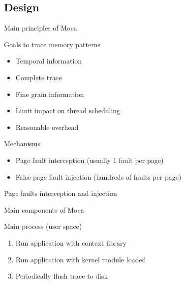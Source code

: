 \documentclass[xcolor={usenames,dvipsnames},hyperref={pdfusetitle}]{beamer}
\begin{document}
\subsection{Design}

\begin{frame}{Main principles of Moca}
    \begin{block}{Goals to trace memory patterns}
        \begin{itemize}
            \item Temporal information
            \item Complete trace
            \item Fine grain information
            \item Limit impact on thread scheduling
            \item Reasonable overhead
        \end{itemize}
    \end{block}
    \pause
    \begin{exampleblock}{Mechanisms}
        \begin{itemize}
            \item Page fault interception (usually 1 fault per page)
            \item False page fault injection (hundreds of faults per page)
        \end{itemize}
    \end{exampleblock}
\end{frame}

\begin{frame}{Page faults interception and injection}
    \centering
    
\end{frame}

\begin{frame}{Main components of Moca}
   \begin{block}{Main process (user space)}
       \begin{enumerate}
           \item Run application with context library
           \item Run application with kernel module loaded
           \item Periodically flush trace to disk
       \end{enumerate}
   \end{block}
\end{frame}
\end{document}

